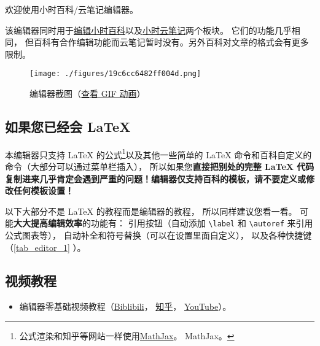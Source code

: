 
欢迎使用小时百科/云笔记编辑器。

该编辑器同时用于\href{https://wuli.wiki/editor/}{编辑小时百科}以及\href{https://wuli.wiki/note/}{小时云笔记}两个板块。 它们的功能几乎相同， 但百科有合作编辑功能而云笔记暂时没有。另外百科对文章的格式会有更多限制。
\begin{figure}[ht]
\centering
\texttt{[image: ./figures/19c6cc6482ff004d.png]}
\caption{编辑器截图（\href{https://wuli.wiki/apps/editor.gif}{查看 GIF 动画}）} \label{fig_editor_3}
\end{figure}

\subsection{如果您已经会 LaTeX}
本编辑器只支持 LaTeX 的公式\footnote{公式渲染和知乎等网站一样使用\href{https://www.mathjax.org/}{MathJax}。 MathJax。}以及其他一些简单的 LaTeX 命令和百科自定义的命令（大部分可以通过菜单栏插入）， 所以如果您\textbf{直接把别处的完整 LaTeX 代码复制进来几乎肯定会遇到严重的问题！编辑器仅支持百科的模板，请不要定义或修改任何模板设置！}

以下大部分不是 LaTeX 的教程而是编辑器的教程， 所以同样建议您看一看。 可能\textbf{大大提高编辑效率}的功能有： 引用按钮（自动添加 \verb|\label| 和 \verb|\autoref| 来引用公式图表等）， 自动补全和符号替换（可以在设置里面自定义）， 以及各种快捷键（\autoref{tab_editor_1} ）。

\subsection{视频教程}
\begin{itemize}
\item 编辑器零基础视频教程（\href{https://www.bilibili.com/video/av87698355/}{Biblibili}， \href{https://zhuanlan.zhihu.com/p/105869878}{知乎}， \href{https://www.youtube.com/watch?v=AN2tXNanD9U&t=1s}{YouTube}）。
\end{itemize}

